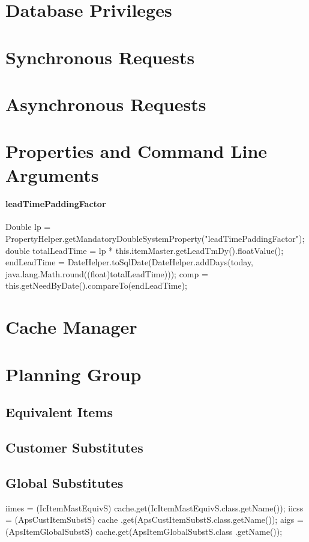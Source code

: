 \documentclass[a4paper,10pt]{book}
\begin{document}
\section{Database Privileges}
\section{Synchronous Requests}
\section{Asynchronous Requests}

\section{Properties and Command Line Arguments}
\paragraph{leadTimePaddingFactor}
        Double lp = PropertyHelper.getMandatoryDoubleSystemProperty("leadTimePaddingFactor");
            double totalLeadTime = lp * this.itemMaster.getLeadTmDy().floatValue();
            endLeadTime = DateHelper.toSqlDate(DateHelper.addDays(today, java.lang.Math.round((float)totalLeadTime)));
            comp = this.getNeedByDate().compareTo(endLeadTime);
\section{Cache Manager}


\section{Planning Group}
\subsection{Equivalent Items}
\subsection{Customer Substitutes}
\subsection{Global Substitutes}
iimes = (IcItemMastEquivS) cache.get(IcItemMastEquivS.class.getName());
	iicss = (ApsCustItemSubstS) cache
		.get(ApsCustItemSubstS.class.getName());
	aigs = (ApsItemGlobalSubstS) cache.get(ApsItemGlobalSubstS.class
		.getName());
\end{document}
